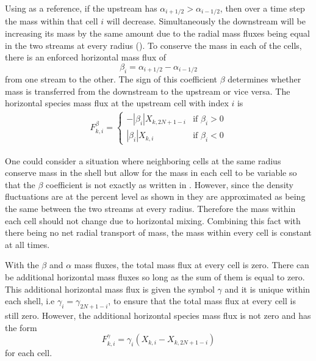 \documentclass[fleqn,usenatbib]{mnras}
\begin{document}
Using  as a reference, if the upstream has $\alpha_{i+1/2} >
\alpha_{i-1/2}$, then over a time step the mass within that cell $i$ will
decrease. Simultaneously the downstream will be increasing its mass by the same
amount due to the radial mass fluxes being equal in the two streams at every
radius (). To conserve the mass in each of the cells, there is an
enforced horizontal mass flux of
%
\begin{equation}
  \label{eq:beta}
    \beta_{i} = \alpha_{i+1/2} - \alpha_{i-1/2}
\end{equation}
%
from one stream to the other. The sign of this coefficient $\beta$ determines
whether mass is transferred from the downstream to the upstream or vice versa.
The horizontal species mass flux at the upstream cell with index $i$ is
%
\begin{align*}
  F^{\beta}_{k,i} = \left\{
  \begin{array}{lr}
      - | \beta_{i} | X_{k,2N+1-i} & \text{if } \beta_{i} > 0 \\
       | \beta_{i} | X_{k,i} & \text{if } \beta_{i} < 0
  \end{array}
  \right.
\end{align*}
%

One could consider a situation where neighboring cells at the same radius
conserve mass in the shell but allow for the mass in each cell to be variable so
that the $\beta$ coefficient is not exactly as written in . However,
since the density fluctuations are at the percent level as shown in
 they are approximated as being the same between the two streams at every radius.
Therefore the mass within each cell should not change due to horizontal mixing.
Combining this fact with there being no net radial transport of mass, the mass
within every cell is constant at all times.

With the $\beta$ and $\alpha$ mass fluxes, the total mass flux at every cell is
zero. There can be additional horizontal mass fluxes so long as the sum of them
is equal to zero. This additional horizontal mass flux is given the symbol
$\gamma$ and it is unique within each shell, i.e $\gamma_{i} =
\gamma_{2N+1-i}$, to ensure that the total mass flux at every cell is still
zero. However, the additional horizontal species mass flux is not zero and has
the form
%
\begin{equation}
\label{eq:gammaflux}
  F^{\gamma}_{k,i} = \gamma_{i} \left( X_{k,i} - X_{k,2N+1-i} \right)
\end{equation}
%
for each cell.
\end{document}
